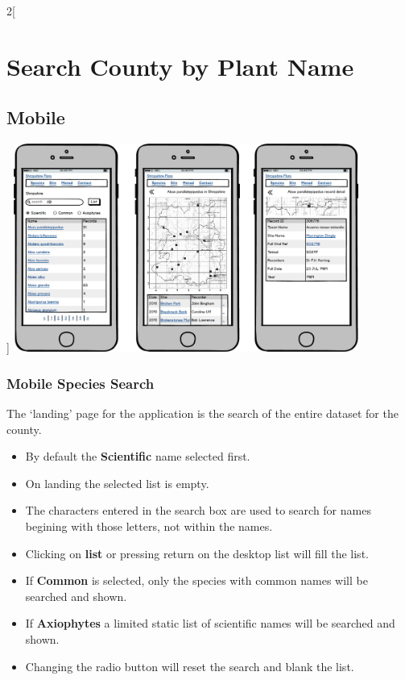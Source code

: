 \documentclass[a4paper,12pt,landscape]{article}
\begin{document}
\begin{multicols*}{2}[%
  \section{Search County by Plant Name}%
  \subsection{Mobile}%
]
\includegraphics[width=0.85\textwidth]{./wireframes/county-mobile.png}%
\clearpage

\subsubsection{Mobile Species Search}
The `landing' page for the application is the search of the entire dataset for the county.

\begin{itemize}
  \item By default the \textbf{Scientific} name selected first.
  \item On landing the selected list is empty.
  \item The characters entered in the search box are used to search for names begining with those letters,
    not within the names.
  \item Clicking on \textbf{list} or pressing return on the desktop list will fill the list.
  \item If \textbf{Common} is selected, only the species with common names will be searched and shown.
  \item If \textbf{Axiophytes} a limited static list of scientific names will be searched and shown.
  \item Changing the radio button will reset the search and blank the list.
\end{itemize}


\end{multicols*}
\end{document}
